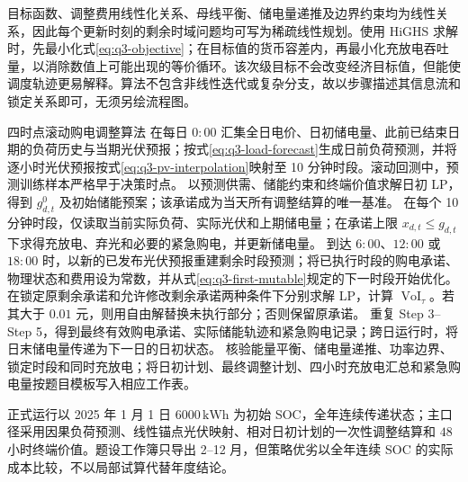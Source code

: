目标函数、调整费用线性化关系、母线平衡、储电量递推及边界约束均为线性关系，因此每个更新时刻的剩余时域问题均可写为稀疏线性规划。使用 HiGHS 求解时，先最小化式\eqref{eq:q3-objective}；在目标值的货币容差内，再最小化充放电吞吐量，以消除数值上可能出现的等价循环。该次级目标不会改变经济目标值，但能使调度轨迹更易解释。算法不包含非线性迭代或复杂分支，故以步骤描述其信息流和锁定关系即可，无须另绘流程图。

\noindent 四时点滚动购电调整算法
\algorithmstart
{}
在每日 $0{:}00$ 汇集全日电价、日初储电量、此前已结束日期的负荷历史与当期光伏预报；按式\eqref{eq:q3-load-forecast}生成日前负荷预测，并将逐小时光伏预报按式\eqref{eq:q3-pv-interpolation}映射至 10 分钟时段。滚动回测中，预测训练样本严格早于决策时点\cite{tashman}。
以预测供需、储能约束和终端价值求解日初 LP，得到 $g^0_{d,t}$ 及初始储能预案；该承诺成为当天所有调整结算的唯一基准。
在每个 10 分钟时段，仅读取当前实际负荷、实际光伏和上期储电量；在承诺上限 $x_{d,t}\le g_{d,t}$ 下求得充放电、弃光和必要的紧急购电，并更新储电量。
到达 $6{:}00$、$12{:}00$ 或 $18{:}00$ 时，以新的已发布光伏预报重建剩余时段预测；将已执行时段的购电承诺、物理状态和费用设为常数，并从式\eqref{eq:q3-first-mutable}规定的下一时段开始优化。
在锁定原剩余承诺和允许修改剩余承诺两种条件下分别求解 LP，计算 $\operatorname{VoI}_{\tau}$。若其大于 $0.01$ 元，则用自由解替换未执行部分；否则保留原承诺。
重复 Step 3--Step 5，得到最终有效购电承诺、实际储能轨迹和紧急购电记录；跨日运行时，将日末储电量传递为下一日的日初状态。
核验能量平衡、储电量递推、功率边界、锁定时段和同时充放电；将日初计划、最终调整计划、四小时充放电汇总和紧急购电量按题目模板写入相应工作表。
\algorithmend

正式运行以 2025 年 1 月 1 日 $6000\,\mathrm{kWh}$ 为初始 SOC，全年连续传递状态；主口径采用因果负荷预测、线性锚点光伏映射、相对日初计划的一次性调整结算和 $48$ 小时终端价值。题设工作簿只导出 2--12 月，但策略优劣以全年连续 SOC 的实际成本比较，不以局部试算代替年度结论。
